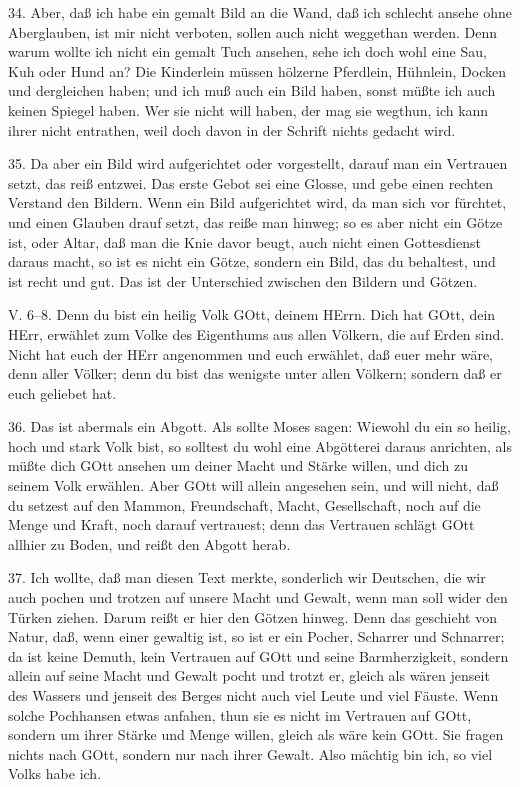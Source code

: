34. Aber, daß ich habe ein gemalt Bild an die Wand, daß ich schlecht ansehe ohne Aberglauben, ist mir nicht verboten, sollen auch nicht weggethan werden. Denn warum wollte ich nicht ein gemalt Tuch ansehen, sehe ich doch wohl eine Sau, Kuh oder Hund an? Die Kinderlein müssen hölzerne Pferdlein, Hühnlein, Docken und dergleichen haben; und ich muß auch ein Bild haben, sonst müßte ich auch keinen Spiegel haben. Wer sie nicht will haben, der
mag sie wegthun, ich kann ihrer nicht entrathen, weil doch davon in der Schrift nichts gedacht wird.

35. Da aber ein Bild wird aufgerichtet oder vorgestellt, darauf man ein Vertrauen setzt, das reiß entzwei. Das erste Gebot sei eine Glosse, und gebe einen rechten Verstand den Bildern. Wenn ein Bild aufgerichtet wird, da man sich vor fürchtet, und einen Glauben drauf setzt, das reiße man hinweg; so es aber nicht ein Götze ist, oder Altar, daß man die Knie davor beugt, auch nicht einen Gottesdienst daraus macht, so ist es nicht ein Götze, sondern ein Bild, das du behaltest, und ist recht und gut. Das ist der Unterschied zwischen den Bildern und Götzen.

\begin{schriftzitat}
V. 6–8. Denn du bist ein heilig Volk GOtt, deinem HErrn. Dich hat GOtt, dein HErr, erwählet zum Volke des Eigenthums aus allen Völkern, die auf Erden sind. Nicht hat euch der HErr angenommen und euch erwählet, daß euer mehr wäre, denn aller Völker; denn du bist das wenigste unter allen Völkern; sondern daß er euch geliebet hat.
\end{schriftzitat}

36. Das ist abermals ein Abgott. Als sollte Moses sagen: Wiewohl du ein so heilig, hoch und stark Volk bist, so solltest du wohl eine Abgötterei daraus anrichten, als müßte dich GOtt ansehen um deiner Macht und Stärke willen, und dich zu seinem Volk erwählen. Aber GOtt will allein angesehen sein, und will nicht, daß du setzest auf den Mammon, Freundschaft, Macht, Gesellschaft, noch auf die Menge und Kraft, noch darauf vertrauest; denn das Vertrauen schlägt GOtt allhier zu Boden, und reißt den Abgott herab.

37. Ich wollte, daß man diesen Text merkte, sonderlich wir Deutschen, die wir auch pochen und trotzen auf unsere Macht und Gewalt, wenn man soll wider den Türken ziehen. Darum reißt er hier den Götzen hinweg. Denn das geschieht von Natur, daß, wenn einer gewaltig ist, so ist er ein Pocher, Scharrer und Schnarrer; da ist keine Demuth, kein Vertrauen auf GOtt und seine Barmherzigkeit, sondern allein auf seine Macht und Gewalt pocht und trotzt er, gleich als wären jenseit des Wassers und jenseit des Berges nicht auch viel Leute und viel Fäuste. Wenn solche Pochhansen etwas anfahen, thun sie es nicht im Vertrauen auf GOtt, sondern um ihrer Stärke und Menge willen, gleich als wäre kein GOtt. Sie fragen nichts nach GOtt, sondern nur nach ihrer Gewalt. Also mächtig bin ich, so viel Volks habe ich.

